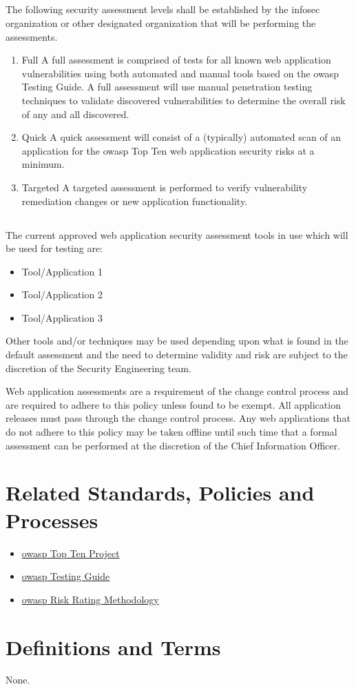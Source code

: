 \subsection*{}
The following security assessment levels shall be established by the \gls{infosec} organization or other designated organization that will be performing the assessments.  
\begin{enumerate}
\item{Full}
A full assessment is comprised of tests for all known web application vulnerabilities using both automated and manual tools based on the \gls{owasp} Testing Guide.  
A full assessment will use manual penetration testing techniques to validate discovered vulnerabilities to determine the overall risk of any and all discovered.
\item{Quick}
A quick assessment will consist of a (typically) automated scan of an application for the \gls{owasp} Top Ten web application security risks at a minimum.
\item{Targeted}
A targeted assessment is performed to verify vulnerability remediation changes or new application functionality.
\end{enumerate}
\subsection*{}
The current approved web application security assessment tools in use which will be used for testing are:
\begin{itemize}
\item{Tool/Application 1}%
\item{Tool/Application 2}%
\item{Tool/Application 3}%
\end{itemize}
Other tools and/or techniques may be used depending upon what is found in the default assessment and the need to determine validity and risk are subject to the discretion of the Security Engineering team.

\CommonPolicyCompliance
Web application assessments are a requirement of the change control process and are required to adhere to this policy unless found to be exempt.  
All application releases must pass through the change control process.  
Any web applications that do not adhere to this policy may be taken offline until such time that a formal assessment can be performed at the discretion of the Chief Information Officer.

\section{Related Standards, Policies and Processes}
\begin{itemize}
\item{}\href{http://www.owasp.org/index.php/Category:OWASP_Top_Ten_Project}{\gls{owasp} Top Ten Project}
\item{}\href{http://www.owasp.org/images/5/56/OWASP_Testing_Guide_v3.pdf}{\gls{owasp} Testing Guide}
\item{}\href{http://www.owasp.org/index.php/OWASP_Risk_Rating_Methodology}{\gls{owasp} Risk Rating Methodology}
\end{itemize}

\section{Definitions and Terms}
None.
\CommonRevisionHistory